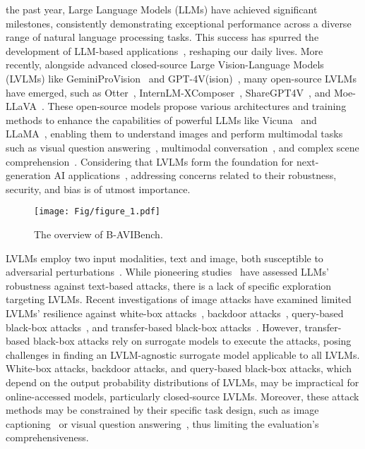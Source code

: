  the past year, Large Language Models (LLMs) have achieved significant milestones, consistently demonstrating exceptional performance across a diverse range of natural language processing tasks. This success has spurred the development of LLM-based applications~\cite{zhang2024open}, reshaping our daily lives. 
More recently, alongside advanced closed-source Large Vision-Language Models (LVLMs) like GeminiProVision~\cite{team2023gemini} and GPT-4V(ision)~\cite{OpenAI2023GPT4TR}, many open-source LVLMs have emerged, such as Otter~\cite{li2023otter}, InternLM-XComposer~\cite{zhang2023internlm}, ShareGPT4V~\cite{chen2023sharegpt4v}, and Moe-LLaVA~\cite{lin2024moe}. These open-source models propose various architectures and training methods to enhance the capabilities of powerful LLMs like Vicuna~\cite{vicuna} and LLaMA~\cite{touvron2023llama}, enabling them to understand images and perform multimodal tasks such as visual question answering~\cite{gao2023llama}, multimodal conversation~\cite{zhang2023gpt4roi}, and complex scene comprehension~\cite{li2023otter}.
Considering that LVLMs form the foundation for next-generation AI applications~\cite{zhang2023scgnet,zhang2024fmgnet,10472506}, addressing concerns related to their robustness, security, and bias is of utmost importance.

\begin{figure}[t]
  \centering
   \texttt{[image: Fig/figure\_1.pdf]}
   \caption{The overview of B-AVIBench.}
   \label{fig:intro}
\end{figure}

LVLMs employ two input modalities, text and image, both susceptible to adversarial perturbations~\cite{10225321,10018268,10416271}. While pioneering studies~\cite{zhu2023promptbench, zou2023universal,mazeika2024harmbench} have assessed LLMs' robustness against text-based attacks, there is a lack of specific exploration targeting LVLMs. 
Recent investigations of image attacks have examined limited LVLMs' resilience against white-box attacks~\cite{schlarmann2023adversarial, qi2023visual}, backdoor attacks~\cite{lu2024test}, query-based black-box attacks~\cite{zhao2024evaluating}, and transfer-based black-box attacks~\cite{dong2023robust}.
However, transfer-based black-box attacks rely on surrogate models to execute the attacks, posing challenges in finding an LVLM-agnostic surrogate model applicable to all LVLMs. White-box attacks, backdoor attacks, and query-based black-box attacks, which depend on the output probability distributions of LVLMs, may be impractical for online-accessed models, particularly closed-source LVLMs.
Moreover, these attack methods may be constrained by their specific task design, such as image captioning~\cite{chen2017attacking} or visual question answering~\cite{schlarmann2023adversarial}, thus limiting the evaluation's comprehensiveness.

